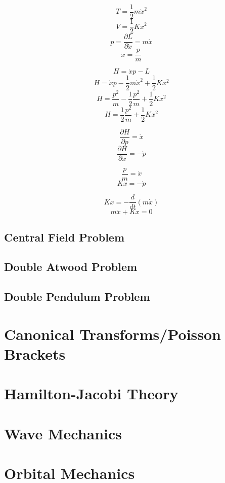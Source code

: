 \documentclass{article}
\begin{document}
$$T = \frac{ 1 }{ 2 } m \dot{ x }^2$$
$$V = \frac{ 1 }{ 2 } K x^2$$
$$p = \frac{ \partial L }{ \partial \dot{ x } } = m \dot{ x }$$
$$\dot{ x } = \frac{ p }{ m }$$

$$H = \dot{ x } p - L$$
$$H = \dot{ x } p - \frac{ 1 }{ 2 } m \dot{ x }^2 + \frac{ 1 }{ 2 } K x^2$$
$$H = \frac{ p^2 }{ m } - \frac{ 1 }{ 2 } \frac{ p^2 }{ m } + \frac{ 1 }{ 2 } K x^2$$
$$H = \frac{ 1 }{ 2 } \frac{ p^2 }{ m } + \frac{ 1 }{ 2 } K x^2$$

$$\frac{ \partial H }{ \partial p } = \dot{ x }$$
$$\frac{ \partial H }{ \partial x } = -\dot{ p }$$

$$\frac{ p }{ m } = \dot{ x }$$
$$K x = -\dot{ p }$$

$$K x = -\frac{ d }{ dt }( m \dot{ x } )$$
$$m \ddot{ x } + Kx = 0$$

%
%
%
\subsection{Central Field Problem}

%
%
%
\subsection{Double Atwood Problem}

%
%
%
\subsection{Double Pendulum Problem}



%
%
\newpage
\section{Canonical Transforms/Poisson Brackets}


%
%
\newpage
\section{Hamilton-Jacobi Theory}



%
%
\newpage
\section{Wave Mechanics}


%
%
\newpage
\section{Orbital Mechanics}
\end{document}
